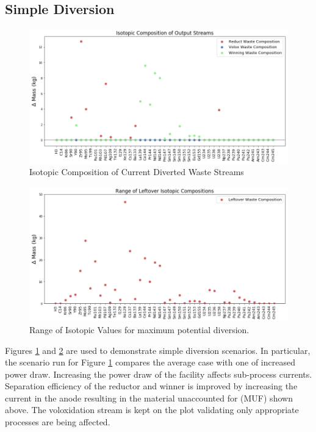 \subsection{Simple Diversion}
\begin{figure} [h]
	\includegraphics[width=\linewidth]{images/current-isotope-comp}
	\caption{Isotopic Composition of Current Diverted Waste Streams}
	\label{fig:current-isotope-comp}
\end{figure}

\begin{figure} [h]
	\includegraphics[width=\linewidth]{images/isotopic-comp-range}
	\caption{Range of Isotopic Values for maximum potential diversion.}
	\label{fig:isotopic-range}
\end{figure}

Figures \ref{fig:current-isotope-comp} and \ref{fig:isotopic-range} are used to demonstrate simple diversion scenarios. In particular, the scenario run for Figure
\ref{fig:current-isotope-comp} compares the average case with one of increased power draw. Increasing the power draw of the facility affects sub-process currents.
Separation efficiency of the reductor and winner is improved by increasing the current in the anode resulting in the material unaccounted for (MUF) shown above. The voloxidation stream
is kept on the plot validating only appropriate processes are being affected. 


